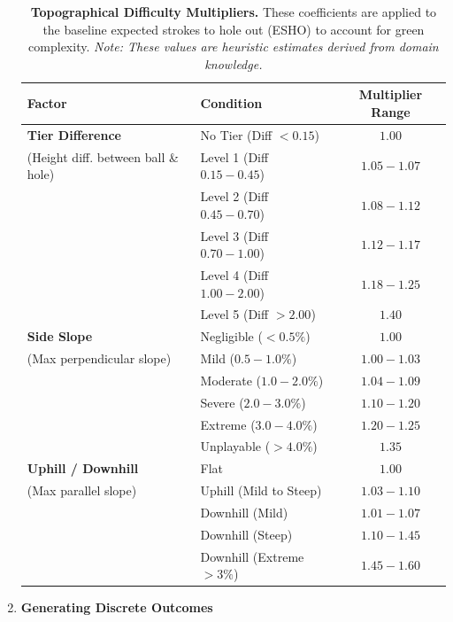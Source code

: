 \documentclass[11pt, letterpaper]{article}
\begin{document}
\begin{enumerate}
\begin{table}[h!]
    \centering
    \small
    \caption{\textbf{Topographical Difficulty Multipliers.} These coefficients are applied to the baseline expected strokes to hole out (ESHO) to account for green complexity. \textit{Note: These values are heuristic estimates derived from domain knowledge.}}
    \label{tab:multipliers}
    \renewcommand{\arraystretch}{1.2}
    \begin{tabular}{llc}
        \toprule
        \textbf{Factor} & \textbf{Condition} & \textbf{Multiplier Range} \\
        \midrule
        \textbf{Tier Difference} & No Tier (Diff $< 0.15$) & $1.00$ \\
        (Height diff. between ball \& hole) & Level 1 (Diff $0.15 - 0.45$) & $1.05 - 1.07$ \\
        & Level 2 (Diff $0.45 - 0.70$) & $1.08 - 1.12$ \\
        & Level 3 (Diff $0.70 - 1.00$) & $1.12 - 1.17$ \\
        & Level 4 (Diff $1.00 - 2.00$) & $1.18 - 1.25$ \\
        & Level 5 (Diff $> 2.00$) & $1.40$ \\
        \midrule
        \textbf{Side Slope} & Negligible ($< 0.5\%$) & $1.00$ \\
        (Max perpendicular slope) & Mild ($0.5 - 1.0\%$) & $1.00 - 1.03$ \\
        & Moderate ($1.0 - 2.0\%$) & $1.04 - 1.09$ \\
        & Severe ($2.0 - 3.0\%$) & $1.10 - 1.20$ \\
        & Extreme ($3.0 - 4.0\%$) & $1.20 - 1.25$ \\
        & Unplayable ($> 4.0\%$) & $1.35$ \\
        \midrule
        \textbf{Uphill / Downhill} & Flat & $1.00$ \\
        (Max parallel slope) & Uphill (Mild to Steep) & $1.03 - 1.10$ \\
        & Downhill (Mild) & $1.01 - 1.07$ \\
        & Downhill (Steep) & $1.10 - 1.45$ \\
        & Downhill (Extreme $>3\%$) & $1.45 - 1.60$ \\
        \bottomrule
    \end{tabular}
\end{table}


\item\textbf{Generating Discrete Outcomes}


\end{enumerate}
\end{document}
